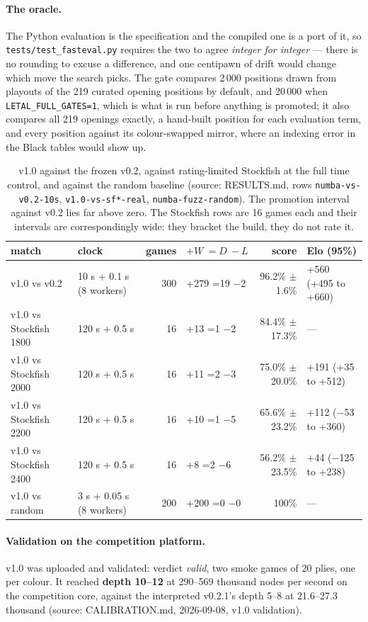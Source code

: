 \documentclass[11pt,a4paper]{article}
\newcommand{\src}[1]{{\small(source: #1)}}
\newcommand{\code}[1]{\texttt{#1}}
\begin{document}
\paragraph{The oracle.} The Python evaluation is the specification and the compiled one is a port of it,
so \code{tests/test\_fasteval.py} requires the two to agree \emph{integer for integer} --- there is no
rounding to excuse a difference, and one centipawn of drift would change which move the search picks. The
gate compares 2\,000 positions drawn from playouts of the 219 curated opening positions by default, and
20\,000 when \code{LETAL\_FULL\_GATES=1}, which is what is run before anything is promoted; it also
compares all 219 openings exactly, a hand-built position for each evaluation term, and every position
against its colour-swapped mirror, where an indexing error in the Black tables would show up.

\begin{table}[H]\centering\small
\begin{tabular}{llrlrl}
\toprule
match & clock & games & $+W\ =D\ -L$ & score & Elo (95\%) \\
\midrule
v1.0 vs v0.2 & 10 s + 0.1 s (8 workers) & 300 & +279 =19 $-$2 & 96.2\% $\pm$ 1.6\% & +560 (+495 to +660) \\
v1.0 vs Stockfish 1800 & 120 s + 0.5 s & 16 & +13 =1 $-$2 & 84.4\% $\pm$ 17.3\% & --- \\
v1.0 vs Stockfish 2000 & 120 s + 0.5 s & 16 & +11 =2 $-$3 & 75.0\% $\pm$ 20.0\% & +191 (+35 to +512) \\
v1.0 vs Stockfish 2200 & 120 s + 0.5 s & 16 & +10 =1 $-$5 & 65.6\% $\pm$ 23.2\% & +112 ($-$53 to +360) \\
v1.0 vs Stockfish 2400 & 120 s + 0.5 s & 16 & +8 =2 $-$6 & 56.2\% $\pm$ 23.5\% & +44 ($-$125 to +238) \\
v1.0 vs random & 3 s + 0.05 s (8 workers) & 200 & +200 =0 $-$0 & 100\% & --- \\
\bottomrule
\end{tabular}
\caption{v1.0 against the frozen v0.2, against rating-limited Stockfish at the full time control, and
against the random baseline \src{RESULTS.md, rows \code{numba-vs-v0.2-10s}, \code{v1.0-vs-sf*-real},
\code{numba-fuzz-random}}. The promotion interval against v0.2 lies far above zero. The Stockfish rows are
16 games each and their intervals are correspondingly wide: they bracket the build, they do not rate it.}
\end{table}

\paragraph{Validation on the competition platform.} v1.0 was uploaded and validated: verdict \emph{valid},
two smoke games of 20 plies, one per colour. It reached \textbf{depth 10--12} at 290--569 thousand nodes
per second on the competition core, against the interpreted v0.2.1's depth 5--8 at 21.6--27.3 thousand
\src{CALIBRATION.md, 2026-09-08, v1.0 validation}.
\end{document}
